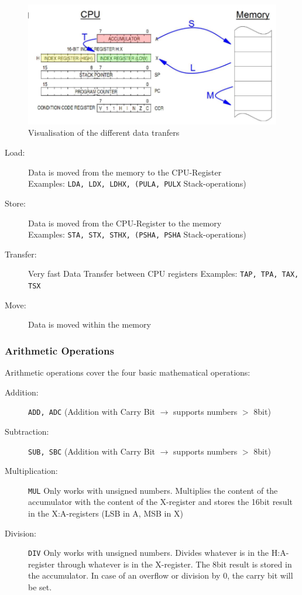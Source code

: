 \documentclass[a4paper, 11pt, nofootinbib]{article}
\newcommand{\code}[1]{\texttt{#1}}
\begin{document}
\begin{figure}[htb!]
	\centering
	\includegraphics[keepaspectratio=true,height=15\baselineskip]{assOperations.PNG}
	\caption{Visualisation of the different data tranfers}
	\label{label}
\end{figure}

\begin{description}
	\item[Load: ] Data is moved from the memory to the CPU-Register \\
		Examples: \code{LDA, LDX, LDHX, (PULA, PULX} Stack-operations)
	\item[Store: ] Data is moved from the CPU-Register to the memory \\
		Examples: \code{STA, STX, STHX, (PSHA, PSHA} Stack-operations) 
	\item[Transfer: ] Very fast Data Transfer between CPU registers
		Examples: \code{TAP, TPA, TAX, TSX}
	\item[Move: ] Data is moved within the memory
\end{description}

\subsubsection{Arithmetic Operations}
Arithmetic operations cover the four basic mathematical operations:

\begin{description}
	\item[Addition: ] \code{ADD, ADC} (Addition with Carry Bit $\rightarrow$ supports numbers $>$ 8bit)
	\item[Subtraction: ] \code{SUB, SBC} (Addition with Carry Bit $\rightarrow$ supports numbers $>$ 8bit)
	\item[Multiplication: ] \code{MUL} Only works with unsigned numbers. Multiplies the content of the accumulator with the content of the X-register and stores the 16bit result in the X:A-registers (LSB in A, MSB in X)
	\item[Division: ] \code{DIV} Only works with unsigned numbers. Divides whatever is in the H:A-register through whatever is in the X-register. The 8bit result is stored in the accumulator. In case of an overflow or division by 0, the carry bit will be set.
\end{description}
\end{document}
